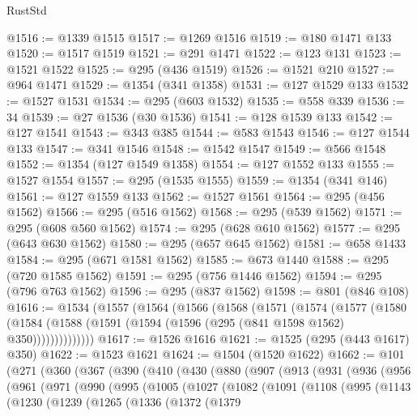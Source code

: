 \begin{lexlean}{RustStd}
\begin{coremodule}
@1516 := @1339 @1515
@1517 := @1269 @1516
@1519 := @180 @1471 @133
@1520 := @1517 @1519
@1521 := @291 @1471
@1522 := @123 @131
@1523 := @1521 @1522
@1525 := @295 (@436 @1519)
@1526 := @1521 @210
@1527 := @964 @1471
@1529 := @1354 (@341 @1358)
@1531 := @127 @1529 @133
@1532 := @1527 @1531
@1534 := @295 (@603 @1532)
@1535 := @558 @339
@1536 := 34
@1539 := @27 @1536 (@30 @1536)
@1541 := @128 @1539 @133
@1542 := @127 @1541
@1543 := @343 @385
@1544 := @583 @1543
@1546 := @127 @1544 @133
@1547 := @341 @1546
@1548 := @1542 @1547
@1549 := @566 @1548
@1552 := @1354 (@127 @1549 @1358)
@1554 := @127 @1552 @133
@1555 := @1527 @1554
@1557 := @295 (@1535 @1555)
@1559 := @1354 (@341 @146)
@1561 := @127 @1559 @133
@1562 := @1527 @1561
@1564 := @295 (@456 @1562)
@1566 := @295 (@516 @1562)
@1568 := @295 (@539 @1562)
@1571 := @295 (@608 @560 @1562)
@1574 := @295 (@628 @610 @1562)
@1577 := @295 (@643 @630 @1562)
@1580 := @295 (@657 @645 @1562)
@1581 := @658 @1433
@1584 := @295 (@671 @1581 @1562)
@1585 := @673 @1440
@1588 := @295 (@720 @1585 @1562)
@1591 := @295 (@756 @1446 @1562)
@1594 := @295 (@796 @763 @1562)
@1596 := @295 (@837 @1562)
@1598 := @801 (@846 @108)
@1616 := @1534
    (@1557
      (@1564
        (@1566
          (@1568
            (@1571
              (@1574
                (@1577
                  (@1580
                    (@1584 (@1588 (@1591 (@1594 (@1596 (@295 (@841 @1598 @1562) @350))))))))))))))
@1617 := @1526 @1616
@1621 := @1525 (@295 (@443 @1617) @350)
@1622 := @1523 @1621
@1624 := @1504 (@1520 @1622)
@1662 := @101
    (@271
      (@360
        (@367
          (@390
            (@410
              (@430
                (@880
                  (@907
                    (@913
                      (@931
                        (@936
                          (@956
                            (@961
                              (@971
                                (@990
                                  (@995
                                    (@1005
                                      (@1027
                                        (@1082
                                          (@1091
                                            (@1108
                                              (@995
                                                (@1143
                                                  (@1230
                                                    (@1239
                                                      (@1265
                                                        (@1336
                                                          (@1372
                                                            (@1379

\end{coremodule}
\end{lexlean}
